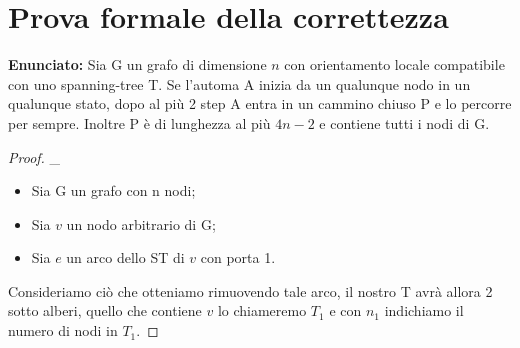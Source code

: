 \section{Prova formale della correttezza}
\textbf{Enunciato: } Sia G un grafo di dimensione $n$ con orientamento locale compatibile con uno spanning-tree T.
Se l'automa A inizia da un qualunque nodo in un qualunque stato, dopo al più 2 step A entra in un cammino chiuso P e lo percorre per sempre. Inoltre P è di lunghezza al più $4n-2$ e contiene tutti i nodi di G.
\begin{proof}
 \_
\begin{itemize}
    \item Sia G un grafo con n nodi;
    \item Sia $v$ un nodo arbitrario di G;
    \item Sia $e$ un arco dello ST di $v$ con porta 1.
\end{itemize}
Consideriamo ciò che otteniamo rimuovendo tale arco, il nostro T avrà allora 2 sotto alberi, quello che contiene $v$ lo chiameremo $T_1$ e con $n_1$ indichiamo il numero di nodi in $T_1$.


\end{proof}
